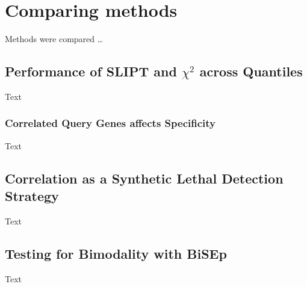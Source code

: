 \section{Comparing methods} \label{chap5:compare_ methods}

Methods were compared \ldots

\subsection{Performance of SLIPT and $\chi^2$  across Quantiles}

Text

\subsubsection{Correlated Query Genes affects Specificity}

Text

\subsection{Correlation as a Synthetic Lethal Detection Strategy}

Text

\subsection{Testing for Bimodality with BiSEp}

Text



\iffalse
\section{Developing a linear model predictor of synthetic lethality}
\subsection{Linear models}
\subsection{Polynomial models}
\subsection{Conditioning}
\subsection{SLIPTv2}
\fi

